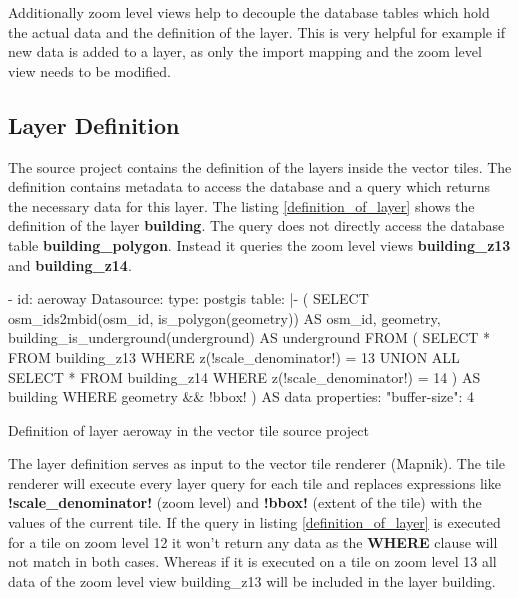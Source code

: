 Additionally zoom level views help to decouple the database tables which hold the actual data and the definition of the layer. This is very helpful for example if new data is added to a layer, as only the import mapping and the zoom level view needs to be modified.

\subsection{Layer Definition}

The source project contains the definition of the layers inside the vector tiles. The definition contains metadata to access the database and a query which returns the necessary data for this layer. The listing \autoref{definition_of_layer} shows the definition of the layer \textbf{building}. The query does not directly access the database table \textbf{building\_polygon}. Instead it queries the zoom level views \textbf{building\_z13} and \textbf{building\_z14}.

\begin{listing}[H]
\begin{yamlcode}
- id: aeroway
    Datasource: 
      type: postgis
      table: |-
        (
          SELECT osm_ids2mbid(osm_id, is_polygon(geometry)) AS osm_id,
                 geometry, building_is_underground(underground) AS underground 
          FROM (
            SELECT * FROM building_z13
            WHERE z(!scale_denominator!) = 13
            UNION ALL
            SELECT * FROM building_z14
            WHERE z(!scale_denominator!) = 14
          ) AS building WHERE geometry && !bbox!
        ) AS data
    properties: 
      "buffer-size": 4
\end{yamlcode}
\caption{Definition of layer aeroway in the vector tile source project}
\label{definition_of_layer}
\end{listing}

The layer definition serves as input to the vector tile renderer (Mapnik). The tile renderer will execute every layer query for each tile and replaces expressions like \textbf{!scale\_denominator!} (zoom level) and \textbf{!bbox!} (extent of the tile) with the values of the current tile. If the query in listing \autoref{definition_of_layer} is executed for a tile on zoom level 12 it won't return any data as the \textbf{WHERE} clause will not match in both cases.
Whereas if it is executed on a tile on zoom level 13 all data of the zoom level view building\_z13 will be included in the layer building.

